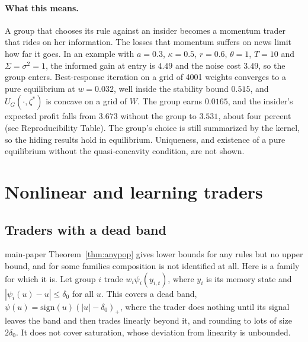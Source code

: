 \documentclass[12pt]{article}
\theoremstyle{definition}
\theoremstyle{remark}
\begin{document}
\paragraph{What this means.} A group that chooses its rule against an insider becomes a momentum trader that rides on her information. The losses that momentum suffers on news limit how far it goes. In an example with $a=0.3$, $\kappa=0.5$, $r=0.6$, $\theta=1$, $T=10$ and $\Sigma=\sigma^2=1$, the informed gain at entry is $4.49$ and the noise cost $3.49$, so the group enters. Best-response iteration on a grid of 4001 weights converges to a pure equilibrium at $w=0.032$, well inside the stability bound $0.515$, and $U_G(\cdot,\zeta^*)$ is concave on a grid of $W$. The group earns $0.0165$, and the insider's expected profit falls from $3.673$ without the group to $3.531$, about four percent (see Reproducibility Table). The group's choice is still summarized by the kernel, so the hiding results hold in equilibrium. Uniqueness, and existence of a pure equilibrium without the quasi-concavity condition, are not shown.

\section{Nonlinear and learning traders}

\subsection{Traders with a dead band}

main-paper Theorem~\ref{thm:anypop} gives lower bounds for any rules but no upper bound, and for some families composition is not identified at all. Here is a family for which it is. Let group $i$ trade $w_i\psi_i(y_{i,t})$, where $y_i$ is its memory state and $|\psi_i(u)-u|\le\delta_0$ for all $u$. This covers a dead band, $\psi(u)=\mathrm{sign}(u)(|u|-\delta_0)_+$, where the trader does nothing until its signal leaves the band and then trades linearly beyond it, and rounding to lots of size $2\delta_0$. It does not cover saturation, whose deviation from linearity is unbounded.
\end{document}
